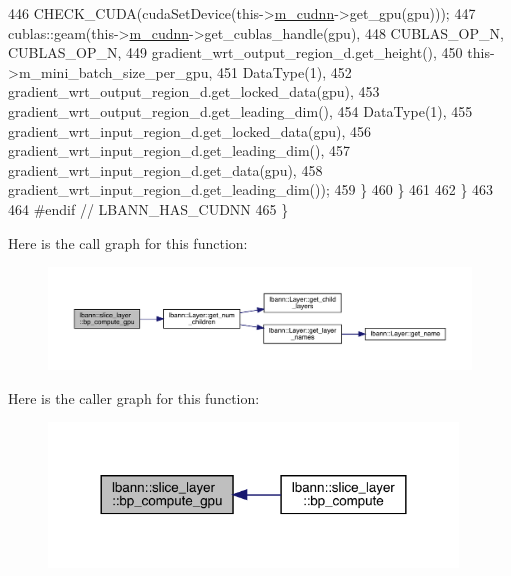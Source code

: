 \begin{DoxyCode}
446           CHECK\_CUDA(cudaSetDevice(this->\hyperlink{classlbann_1_1Layer_a08dbb94239e3b8c96329786c57c72e21}{m\_cudnn}->get\_gpu(gpu)));
447           cublas::geam(this->\hyperlink{classlbann_1_1Layer_a08dbb94239e3b8c96329786c57c72e21}{m\_cudnn}->get\_cublas\_handle(gpu),
448                        CUBLAS\_OP\_N, CUBLAS\_OP\_N,
449                        gradient\_wrt\_output\_region\_d.get\_height(),
450                        this->m\_mini\_batch\_size\_per\_gpu,
451                        DataType(1),
452                        gradient\_wrt\_output\_region\_d.get\_locked\_data(gpu),
453                        gradient\_wrt\_output\_region\_d.get\_leading\_dim(),
454                        DataType(1),
455                        gradient\_wrt\_input\_region\_d.get\_locked\_data(gpu),
456                        gradient\_wrt\_input\_region\_d.get\_leading\_dim(),
457                        gradient\_wrt\_input\_region\_d.get\_data(gpu),
458                        gradient\_wrt\_input\_region\_d.get\_leading\_dim());
459         \}
460       \}
461 
462     \}
463 
464 \textcolor{preprocessor}{  #endif // LBANN\_HAS\_CUDNN}
465   \}
\end{DoxyCode}
Here is the call graph for this function\+:\nopagebreak
\begin{figure}[H]
\begin{center}
\leavevmode
\includegraphics[width=350pt]{classlbann_1_1slice__layer_a798c10e5c19f58e38da9d2d50c49ca3e_cgraph}
\end{center}
\end{figure}
Here is the caller graph for this function\+:\nopagebreak
\begin{figure}[H]
\begin{center}
\leavevmode
\includegraphics[width=308pt]{classlbann_1_1slice__layer_a798c10e5c19f58e38da9d2d50c49ca3e_icgraph}
\end{center}
\end{figure}
\mbox{\label{classlbann_1_1slice__layer_a8c2b93a3ed24b239cc429ee85ee7ef29}} 
